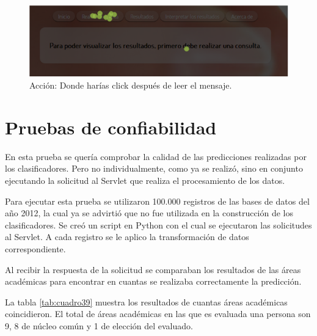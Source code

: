 \begin{figure}[!htb]
\begin{centering}
\includegraphics[scale=0.6]{realizarconsultatest}
\par\end{centering}
\caption{Acción: Donde harías click después de leer el mensaje.}
\label{fig:figura7}
\end{figure}
\section{Pruebas de confiabilidad}
En esta prueba se quería comprobar la calidad de las predicciones realizadas por los clasificadores. Pero no individualmente, como ya se realizó, sino en conjunto ejecutando la solicitud al Servlet que realiza el procesamiento de los datos.

Para ejecutar esta prueba se utilizaron 100.000 registros de las bases de datos del año 2012, la cual ya se advirtió que no fue utilizada en la construcción de los clasificadores. Se creó un script en Python con el cual se ejecutaron las solicitudes al Servlet. A cada registro se le aplico la transformación de datos correspondiente.

Al recibir la respuesta de la solicitud se comparaban los resultados de las áreas académicas para encontrar en cuantas se realizaba correctamente la predicción.

La tabla \ref{tab:cuadro39} muestra los resultados de cuantas áreas académicas coincidieron. El total de áreas académicas en las que es evaluada una persona son 9, 8 de núcleo común y 1 de elección del evaluado.

